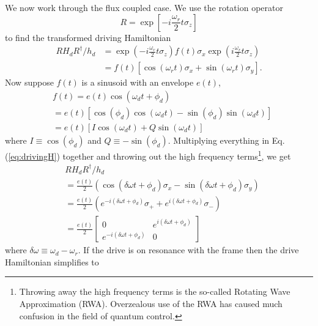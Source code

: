 We now work through the flux coupled case.
We use the rotation operator
\begin{equation}
  R = \exp \left[ -i \frac{\omega_r}{2} t \sigma_z \right]
\end{equation}
to find the transformed driving Hamiltonian \begin{align}
  RH_d R^{\dagger}/h_d
  &=
    \exp\left(-i \frac{\omega_r}{2} t \sigma_z \right)
    f(t) \sigma_x
    \exp\left( i \frac{\omega_r}{2} t \sigma_z \right) \nonumber \\
  &= f(t)
    \left[
      \cos\left(\omega_r t\right)\sigma_x + \sin\left(\omega_r t\right)\sigma_y
    \right]. \label{eq:drivingH}
\end{align}
Now suppose $f(t)$ is a sinusoid with an envelope $e(t)$,
\begin{align}
  & f(t)
    = e(t)\cos \left( \omega_d t + \phi_d \right) \nonumber \\
  &= e(t)
    \left[
      \cos(\phi_d) \cos(\omega_d t) - \sin(\phi_d) \sin(\omega_d t)
    \right] \nonumber \\
  &= e(t)
    \left[
      I \cos\left(\omega_d t\right) + Q \sin \left(\omega_d t\right)
    \right] \label{eq:drivingFunctionIQ}
\end{align}
where $I \equiv \cos(\phi_d)$ and $Q \equiv - \sin(\phi_d)$.
Multiplying everything in Eq. (\ref{eq:drivingH}) together and throwing out the high frequency terms\footnote{Throwing away the high frequency terms is the so-called Rotating Wave Approximation (RWA). Overzealous use of the RWA has caused much confusion in the field of quantum control.}, we get
\begin{align}
& RH_dR^{\dagger}/h_d \nonumber \\
  &= \frac{e(t)}{2}
  \left(
    \cos(\delta\omega t + \phi_d)\sigma_x - \sin(\delta\omega t + \phi_d)\sigma_y
  \right) \nonumber \\
  &= \frac{e(t)}{2}
  \left(
    e^{-i(\delta \omega t + \phi_d)} \sigma_+ + e^{i(\delta \omega t + \phi_d)} \sigma_-
  \right) \nonumber \\
  &= \frac{e(t)}{2}
  \left[ \begin{array}{cc}
    0 & e^{i(\delta\omega t + \phi_d)} \\
    e^{-i(\delta\omega t + \phi_d)} & 0
  \end{array} \right] \label{eq:drivingH_matrixForm}
\end{align}
where $\delta\omega \equiv \omega_d - \omega_r$.
If the drive is on resonance with the frame then the drive Hamiltonian simplifies to
